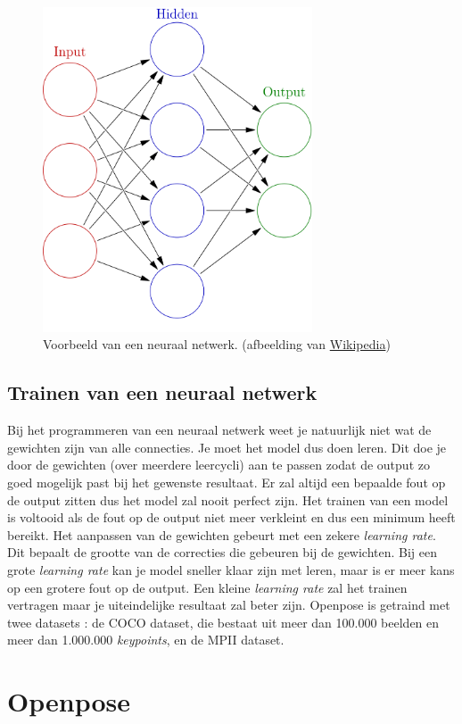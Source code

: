 \documentclass[a4paper,twoside,kulak]{kulakreport}
\begin{document}
\begin{figure}
	\begin{center}
		\includegraphics[width=8cm]{netwerk.png}
	\end{center}
	\caption{Voorbeeld van een neuraal netwerk. (afbeelding van \href{wikipedia.org}{Wikipedia})}
	\label{netwerk}
\end{figure}

\subsection{Trainen van een neuraal netwerk}
Bij het programmeren van een neuraal netwerk weet je natuurlijk niet wat de gewichten zijn van alle connecties. Je moet het model dus doen leren. Dit doe je door de gewichten (over meerdere leercycli) aan te passen zodat de output zo goed mogelijk past bij het gewenste resultaat. Er zal altijd een bepaalde fout op de output zitten dus het model zal nooit perfect zijn. Het trainen van een model is voltooid als de fout op de output niet meer verkleint en dus een minimum heeft bereikt. Het aanpassen van de gewichten gebeurt met een zekere \emph{learning rate}. Dit bepaalt de grootte van de correcties die gebeuren bij de gewichten. Bij een grote \emph{learning rate} kan je model sneller klaar zijn met leren, maar is er meer kans op een grotere fout op de output. Een kleine \emph{learning rate} zal het trainen vertragen maar je uiteindelijke resultaat zal beter zijn. Openpose is getraind met twee datasets \cite{openpose}: de COCO dataset, die bestaat uit meer dan 100.000 beelden en meer dan 1.000.000 \emph{keypoints}, en de MPII dataset.
\section{Openpose}
\end{document}
